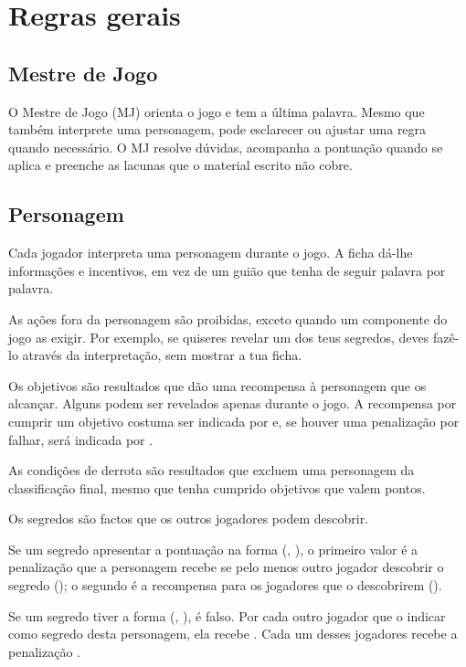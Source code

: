 \section{Regras gerais}

\subsection{Mestre de Jogo}
O Mestre de Jogo (MJ) orienta o jogo e tem a última palavra. Mesmo que também interprete uma personagem, pode esclarecer ou ajustar uma regra quando necessário. O MJ resolve dúvidas, acompanha a pontuação quando se aplica e preenche as lacunas que o material escrito não cobre.

\subsection{Personagem}
Cada jogador interpreta uma personagem durante o jogo. A ficha dá-lhe informações e incentivos, em vez de um guião que tenha de seguir palavra por palavra.

As ações fora da personagem são proibidas, exceto quando um componente do jogo as exigir. Por exemplo, se quiseres revelar um dos teus segredos, deves fazê-lo através da interpretação, sem mostrar a tua ficha.

Os objetivos são resultados que dão uma recompensa à personagem que os alcançar. Alguns podem ser revelados apenas durante o jogo. A recompensa por cumprir um objetivo costuma ser indicada por  e, se houver uma penalização por falhar, será indicada por .

As condições de derrota são resultados que excluem uma personagem da classificação final, mesmo que tenha cumprido objetivos que valem pontos.

Os segredos são factos que os outros jogadores podem descobrir.

Se um segredo apresentar a pontuação na forma (, ), o primeiro valor é a penalização que a personagem recebe se pelo menos outro jogador descobrir o segredo (); o segundo é a recompensa para os jogadores que o descobrirem ().

Se um segredo tiver a forma (, ), é falso. Por cada outro jogador que o indicar como segredo desta personagem, ela recebe . Cada um desses jogadores recebe a penalização .

